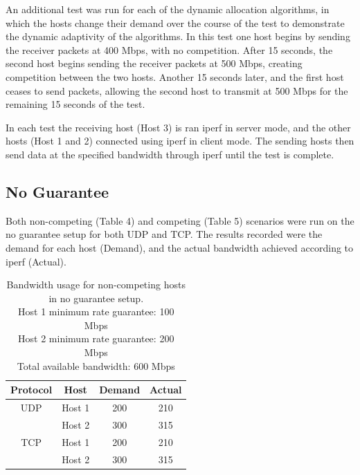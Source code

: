 \documentclass[accepted,single]{gipaper}
\begin{document}
An additional test was run for each of the dynamic allocation algorithms, in which the hosts change their demand over the course of the test to demonstrate the dynamic adaptivity of the algorithms. In this test one host begins by sending the receiver packets at 400 Mbps, with no competition. After 15 seconds, the second host begins sending the receiver packets at 500 Mbps, creating competition between the two hosts. Another 15 seconds later, and the first host ceases to send packets, allowing the second host to transmit at 500 Mbps for the remaining 15 seconds of the test.

In each test the receiving host (Host 3) is ran iperf\cite{iperf} in server mode, and the other hosts (Host 1 and 2) connected using iperf in client mode. The sending hosts then send data at the specified bandwidth through iperf until the test is complete.

\subsection{No Guarantee}
\label{no_guar}

Both non-competing (Table 4) and competing (Table 5) scenarios were run on the no guarantee setup for both UDP and TCP. The results recorded were the demand for each host (Demand), and the actual bandwidth achieved according to iperf (Actual). 

\begin{table}[h]
	\label{ng_nc}
	\vspace{-2mm}
	\begin{center}
		\begin{small}
			\begin{tabular}{cccc}
				Protocol & Host & Demand & Actual \\
				\hline
				UDP & Host 1 & 200 & 210\\
				    & Host 2 & 300 & 315\\
				\hline
				TCP & Host 1 & 200 & 210\\
				    & Host 2 & 300 & 315\\
			\end{tabular}
		\end{small}
	\end{center}
	\caption{Bandwidth usage for non-competing hosts in no guarantee setup.\\
	Host 1 minimum rate guarantee: 100 Mbps\\
	Host 2 minimum rate guarantee: 200 Mbps\\	
	Total available bandwidth: 600 Mbps}
	\vspace{-3mm}
\end{table}
\end{document}
